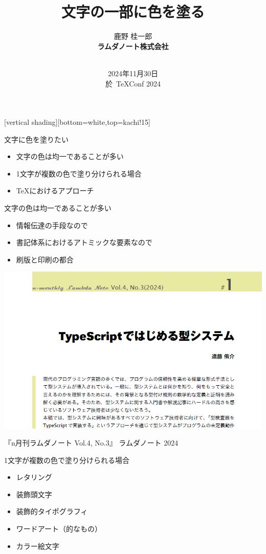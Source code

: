 \documentclass[unicode,14pt]{beamer}
\title{文字の一部に色を塗る}
\author{\sffamily 鹿野 桂一郎\\
\bfseries ラムダノート株式会社\\
\small\bfseries \email{k16.shikano@lambdanote.com} \\ 
\twitter{golden\_lucky} 
}
\date{\sffamily\footnotesize 2024年11月30日\\ 於\, TeXConf 2024}
\begin{document}
\frame{\titlepage}

[vertical shading][bottom=white,top=kachi!15]

\begin{frame}[t]{\inhibitglue 文字に色を塗りたい}
  \sffamily
  \begin{itemize}
    \item 文字の色は均一であることが多い
    \item 1文字が複数の色で塗り分けられる場合
    \item TeXにおけるアプローチ
  \end{itemize}
  \vfill
\end{frame}

\begin{frame}[t]{文字の色は均一であることが多い}
  \sffamily
  \begin{itemize}
    \item 情報伝達の手段なので
    \item 書記体系におけるアトミックな要素なので
    \item 刷版と印刷の都合
  \end{itemize}
  \begin{center}
    \includegraphics[width=.50\textwidth]{figures/nlambda.png}
  \end{center}
\raggedleft\tiny\color{50gray} 『n月刊ラムダノート Vol.4, No.3』 ラムダノート 2024
\end{frame}

\begin{frame}[t]{1文字が複数の色で塗り分けられる場合}
  \sffamily
  \begin{itemize}
\item レタリング
\item 装飾頭文字
\item 装飾的タイポグラフィ
\item ワードアート（的なもの）
\item カラー絵文字
  \end{itemize}
\end{frame}
\end{document}
